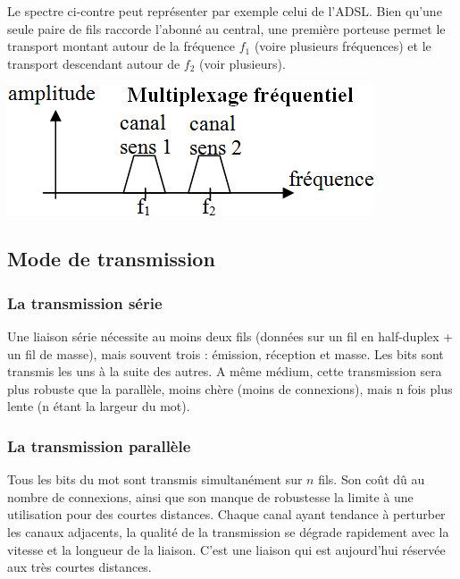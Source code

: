 \documentclass[10pt]{article}
\begin{document}
\begin{minipage}[c]{.6\linewidth}
Le spectre ci-contre peut représenter par exemple celui de l’ADSL. Bien qu’une seule paire de fils raccorde l’abonné au central, une première porteuse permet le transport montant autour de la fréquence $f_1$ (voire plusieurs fréquences) et le transport descendant autour de $f_2$ (voir plusieurs).
\end{minipage} \hfill
\begin{minipage}[c]{.36\linewidth}
\begin{center}
\includegraphics[width=.95\textwidth]{images/fig_05}
\end{center}
\end{minipage} 

\subsection{Mode de transmission}

\subsubsection*{La transmission série}
Une liaison série nécessite au moins deux fils (données sur un fil en half-duplex + un fil de masse), mais souvent trois : émission, réception et masse. Les bits sont transmis les uns à la suite des autres. A même médium, cette transmission sera plus robuste que la parallèle, moins chère (moins de connexions), mais n fois plus lente (n étant la largeur du mot).

\subsubsection*{La transmission parallèle}
Tous les bits du mot sont transmis simultanément sur $n$ fils.
Son coût dû au nombre de connexions, ainsi que son manque de robustesse la limite à une utilisation pour des courtes distances. Chaque canal ayant tendance à perturber les canaux adjacents, la qualité de la transmission se dégrade rapidement avec la vitesse et la longueur de la liaison. C’est une liaison qui est aujourd’hui  réservée aux très courtes distances.
\end{document}
